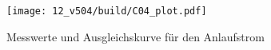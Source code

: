 \begin{figure}[h]%
    \centering%
    \texttt{[image: 12\_v504/build/C04\_plot.pdf]}%
    \caption{Messwerte und Ausgleichskurve für den Anlaufstrom}%
    \label{fig:c04}%
\end{figure}%